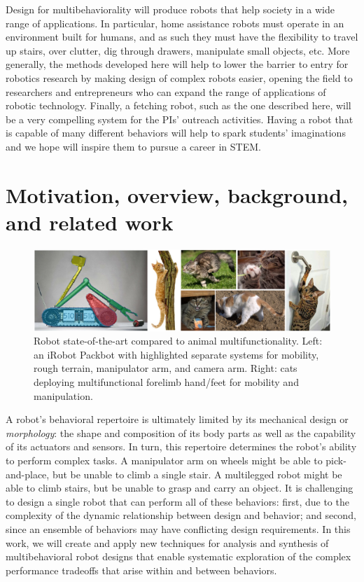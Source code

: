 \documentclass[11pt]{article}
\begin{document}

Design for multibehaviorality will produce robots that help society in a wide range of applications. In particular, home assistance robots must operate in an environment built for humans,
and as such they must have the flexibility to travel up stairs, over clutter, dig through drawers, manipulate small objects, etc. More generally, the methods developed here will help to lower the barrier to entry for robotics research by making design of complex robots easier, opening the field to
researchers and entrepreneurs who can expand the range of applications
of robotic technology.
Finally, a fetching robot, such as the one described here, will be a very compelling system for the PIs' outreach activities. Having a robot that is capable of many different behaviors will help to spark students' imaginations and we hope will inspire them to pursue a career in STEM.


\pagebreak
\setcounter{page}{1}

\section{Motivation, overview, background, and related work}

\begin{figure}[b]
    \vspace{0.05cm}
    \centering
    \includegraphics[width=0.9\columnwidth]{packbot_vs_cats.png}
\caption{Robot state-of-the-art compared to animal multifunctionality. Left: an iRobot Packbot with highlighted separate systems for mobility, rough terrain, manipulator arm, and camera arm. Right: cats deploying multifunctional forelimb hand/feet for mobility and manipulation. 
}
    \label{fig:cats}
\end{figure}


A robot's behavioral repertoire is ultimately limited by its mechanical design or \emph{morphology}: the shape and composition of its body parts as well as the capability of its actuators and sensors.
In turn, this repertoire determines the robot's ability to perform complex tasks. 
A manipulator arm on wheels might be able to pick-and-place, but be unable to climb a single stair. 
A multilegged robot might be able to climb stairs, but be unable to grasp and carry an object.
It is challenging to design a single robot that can perform all of these behaviors:
first, 
due to the complexity of the dynamic relationship between design and behavior;
and second,
since an ensemble of behaviors may have conflicting design requirements.
In this work, we will create and apply new techniques for analysis and synthesis of multibehavioral robot designs that enable systematic exploration of the complex performance tradeoffs that arise within and between behaviors.
\end{document}
